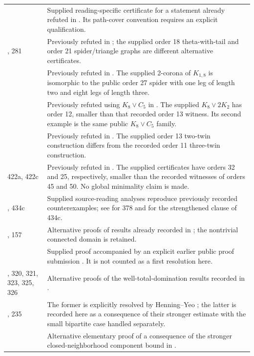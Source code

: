 \documentclass[11pt,a4paper]{article}
\theoremstyle{remark}
\begin{document}
\begin{longtable}{@{}>{\raggedright\arraybackslash}p{2.5cm}>{\raggedright\arraybackslash}p{11.3cm}@{}}
247 & Supplied reading-specific certificate for a statement already refuted in \cite[\S7fy]{Audit}. Its path-cover convention requires an explicit qualification.\\
267, 281 & Previously refuted in \cite[\S7fz and \S8]{Audit}; the supplied order 18 theta-with-tail and order 21 spider/triangle graphs are different alternative certificates.\\
287 & Previously refuted in \cite[\S8a]{Audit}. The supplied 2-corona of $K_{1, 8}$ is isomorphic to the public order 27 spider with one leg of length two and eight legs of length three.\\
328 & Previously refuted using $K_8\vee C_5$ in \cite[\S7bi]{Audit}. The supplied $K_8\vee2K_2$ has order 12, smaller than that recorded order 13 witness. Its second example is the same public $K_8\vee C_5$ family.\\
402 & Previously refuted in \cite[\S7ba]{Audit}. The supplied order 13 two-twin construction differs from the recorded order 11 three-twin construction.\\
422a, 422c & Previously refuted in \cite[\S7bd--7be]{Audit}. The supplied certificates have orders 32 and 25, respectively, smaller than the recorded witnesses of orders 45 and 50. No global minimality claim is made.\\
378, 434c & Supplied source-reading analyses reproduce previously recorded counterexamples; see \cite{Ultra26} for 378 and \cite[\S7bo]{Audit} for the strengthened clause of 434c.\\
137, 157 & Alternative proofs of results already recorded in \cite[\S7hw and \S7fb.6]{Audit}; the nontrivial connected domain is retained.\\
96 & Supplied proof accompanied by an explicit earlier public proof submission \cite{Prior96}. It is not counted as a first resolution here.\\
318, 320, 321, 323, 325, 326 & Alternative proofs of the well-total-domination results recorded in \cite[\S7ff, \S7fi--7fl]{Audit}.\\
233, 235 & The former is explicitly resolved by Henning--Yeo \cite{HY14}; the latter is recorded here as a consequence of their stronger estimate with the small bipartite case handled separately.\\
241 & Alternative elementary proof of a consequence of the stronger closed-neighborhood component bound in \cite{Geb26Packing}.\\
\bottomrule
\end{longtable}
\endgroup
\end{document}
